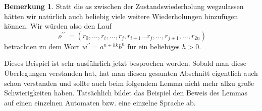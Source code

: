 \documentclass[11pt, a4paper]{article}
\theoremstyle{definition}
\newtheorem*{remark*}{Bemerkung}
\theoremstyle{plain}
\numberwithin{equation}{section}
\begin{document}
\begin{remark*}
	Statt die $a$s zwischen der Zustandswiederholung wegzulassen hätten wir natürlich auch beliebig viele weitere Wiederholungen hinzufügen können. Wir würden also den Lauf
	$$
		\varrho^{\prime\prime} = (r_0, \ldots, r_i, \ldots, r_j, r_{i+1} \ldots r_j, \ldots, r_{j+1}, \ldots, r_{2n})
	$$
	betrachten zu dem Wort $w^{\prime\prime} = a^{n+hk}b^n$ für ein beliebiges $h > 0$.
\end{remark*}
Dieses Beispiel ist sehr ausführlich jetzt besprochen worden. Sobald man diese Ü\-ber\-le\-gung\-en verstanden hat, hat man diesen gesamten Abschnitt eigentlich auch schon verstanden und sollte auch beim folgendem Lemma nicht mehr allzu große Schwierigkeiten haben. Tatsächlich bildet das Beispiel den Beweis des Lemmas auf einen einzelnen Automaten bzw. eine einzelne Sprache ab.
\end{document}
